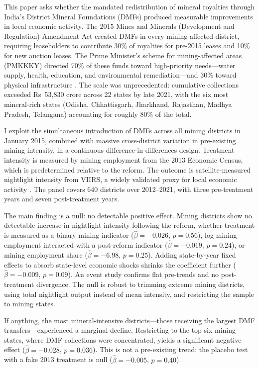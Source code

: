 \documentclass[12pt]{article}
\begin{document}
This paper asks whether the mandated redistribution of mineral royalties through India's District Mineral Foundations (DMFs) produced measurable improvements in local economic activity. The 2015 Mines and Minerals (Development and Regulation) Amendment Act created DMFs in every mining-affected district, requiring leaseholders to contribute 30\% of royalties for pre-2015 leases and 10\% for new auction leases. The Prime Minister's scheme for mining-affected areas (PMKKKY) directed 70\% of these funds toward high-priority needs---water supply, health, education, and environmental remediation---and 30\% toward physical infrastructure \citep{cag2021dmf}. The scale was unprecedented: cumulative collections exceeded Rs~53,830 crore across 22 states by late 2021, with the six most mineral-rich states (Odisha, Chhattisgarh, Jharkhand, Rajasthan, Madhya Pradesh, Telangana) accounting for roughly 80\% of the total.

I exploit the simultaneous introduction of DMFs across all mining districts in January 2015, combined with massive cross-district variation in pre-existing mining intensity, in a continuous difference-in-differences design. Treatment intensity is measured by mining employment from the 2013 Economic Census, which is predetermined relative to the reform. The outcome is satellite-measured nightlight intensity from VIIRS, a widely validated proxy for local economic activity \citep{henderson2012measuring, martinez2022much}. The panel covers 640 districts over 2012--2021, with three pre-treatment years and seven post-treatment years.

The main finding is a null: no detectable positive effect. Mining districts show no detectable increase in nightlight intensity following the reform, whether treatment is measured as a binary mining indicator ($\hat{\beta} = -0.026$, $p = 0.56$), log mining employment interacted with a post-reform indicator ($\hat{\beta} = -0.019$, $p = 0.24$), or mining employment share ($\hat{\beta} = -6.98$, $p = 0.25$). Adding state-by-year fixed effects to absorb state-level economic shocks shrinks the coefficient further ($\hat{\beta} = -0.009$, $p = 0.09$). An event study confirms flat pre-trends and no post-treatment divergence. The null is robust to trimming extreme mining districts, using total nightlight output instead of mean intensity, and restricting the sample to mining states.

If anything, the most mineral-intensive districts---those receiving the largest DMF transfers---experienced a marginal decline. Restricting to the top six mining states, where DMF collections were concentrated, yields a significant negative effect ($\hat{\beta} = -0.028$, $p = 0.036$). This is not a pre-existing trend: the placebo test with a fake 2013 treatment is null ($\hat{\beta} = -0.005$, $p = 0.40$).
\end{document}
